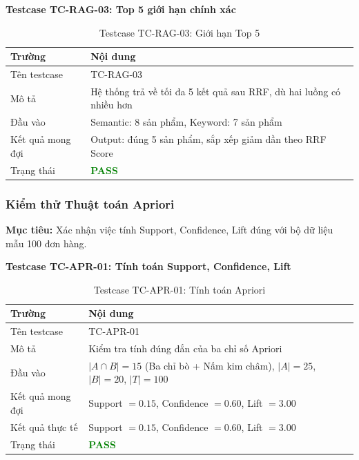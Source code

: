 \documentclass[12pt,a4paper]{report}
\begin{document}
\textbf{Testcase TC-RAG-03: Top 5 giới hạn chính xác}

\begin{table}[htbp]
\centering
\renewcommand{\arraystretch}{1.3}
\begin{tabular}{|l|p{8cm}|}
\hline
\rowcolor[HTML]{EFEFEF}
\textbf{Trường} & \textbf{Nội dung} \\ \hline
Tên testcase & TC-RAG-03 \\ \hline
Mô tả & Hệ thống trả về tối đa 5 kết quả sau RRF, dù hai luồng có nhiều hơn \\ \hline
Đầu vào & Semantic: 8 sản phẩm, Keyword: 7 sản phẩm \\ \hline
Kết quả mong đợi & Output: đúng 5 sản phẩm, sắp xếp giảm dần theo RRF Score \\ \hline
Trạng thái & \textcolor{green}{\textbf{PASS}} \\ \hline
\end{tabular}
\caption{Testcase TC-RAG-03: Giới hạn Top 5}
\end{table}

\subsubsection{Kiểm thử Thuật toán Apriori}

\textbf{Mục tiêu:} Xác nhận việc tính Support, Confidence, Lift đúng với bộ dữ liệu mẫu 100 đơn hàng.

\textbf{Testcase TC-APR-01: Tính toán Support, Confidence, Lift}

\begin{table}[htbp]
\centering
\renewcommand{\arraystretch}{1.3}
\begin{tabular}{|l|p{8cm}|}
\hline
\rowcolor[HTML]{EFEFEF}
\textbf{Trường} & \textbf{Nội dung} \\ \hline
Tên testcase & TC-APR-01 \\ \hline
Mô tả & Kiểm tra tính đúng đắn của ba chỉ số Apriori \\ \hline
Đầu vào & $|A \cap B| = 15$ (Ba chỉ bò + Nấm kim châm), $|A| = 25$, $|B| = 20$, $|T| = 100$ \\ \hline
Kết quả mong đợi & Support $= 0.15$, Confidence $= 0.60$, Lift $= 3.00$ \\ \hline
Kết quả thực tế & Support $= 0.15$, Confidence $= 0.60$, Lift $= 3.00$ \\ \hline
Trạng thái & \textcolor{green}{\textbf{PASS}} \\ \hline
\end{tabular}
\caption{Testcase TC-APR-01: Tính toán Apriori}
\end{table}
\end{document}
